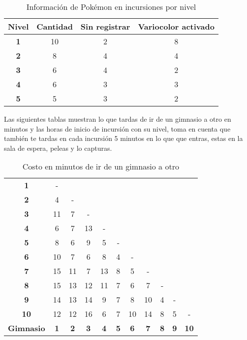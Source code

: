 \documentclass[10pt,letterpaper,twoside,openright]{article}
\begin{document}
	\begin{table}[h!]
	\centering
	\begin{adjustbox}{max width=\textwidth}
	\begin{tabular}{c||ccc} 
	\textbf{Nivel} & \textbf{Cantidad} & \textbf{Sin registrar} & \textbf{Variocolor activado} \\ 
	\hline 
	\textbf{1} & 10 & 2 & 8 \\ 
	\hline 
	\textbf{2} & 8 & 4 & 4 \\ 
	\hline 
	\textbf{3} & 6 & 4 & 2 \\ 
	\hline 
	\textbf{4} & 6 & 3 & 3 \\ 
	\hline 
	\textbf{5} & 5 & 3 & 2 \\ 
	\hline 
	\end{tabular} 
	\end{adjustbox}
	\caption{Información de Pokémon en incursiones por nivel}
	\label{tab:pokemon}
	\end{table}
	
	Las siguientes tablas muestran lo que tardas de ir de un gimnasio a otro en minutos y las horas de inicio de incursión con su nivel, toma en cuenta que también te tardas en cada incursión 5 minutos en lo que que entras, estas en la sala de espera, peleas y lo capturas.
	
	\begin{table}[h!]
	\centering
	\begin{adjustbox}{max width=\textwidth}
	\begin{tabular}{c||*{10}{c|}}
  	\cline{1-2}
  	\textbf{1} & -                     				  		\\ \cline{1-3}
  	\textbf{2} & 4 & -                                 		\\ \cline{1-4}
  	\textbf{3} & 11 & 7 & -                             	\\ \cline{1-5}
 	\textbf{4} & 6 & 7 & 13 & -                        		\\ \cline{1-6}
 	\textbf{5} & 8 & 6 & 9 & 5 & -                     		\\ \cline{1-7}
 	\textbf{6} & 10 & 7 & 6 & 8 & 4 & -              		\\ \cline{1-8}
 	\textbf{7} & 15 & 11 & 7 & 13 & 8 & 5 & -             	\\ \cline{1-9}
  	\textbf{8} & 15 & 13 & 12 & 11 & 7 & 6 & 7 & -        	\\ \cline{1-10}
  	\textbf{9} & 14 & 13 & 14 & 9 & 7 & 8 & 10 & 4 & -     	\\ \hline
 	\textbf{10} & 12 & 12 & 16 & 6 & 7 & 10 & 14 & 8 & 5 & -	\\ \hline \hline
 	\textbf{Gimnasio} & \textbf{1} & \textbf{2} & \textbf{3} & \textbf{4} & \textbf{5} & \textbf{6} & \textbf{7} & \textbf{8} & \textbf{9} & \textbf{10}		\\
	\end{tabular} 
	\end{adjustbox}
	\caption{Costo en minutos de ir de un gimnasio a otro}
	\label{tab:gimnasios}
	\end{table}
	
\end{document}
